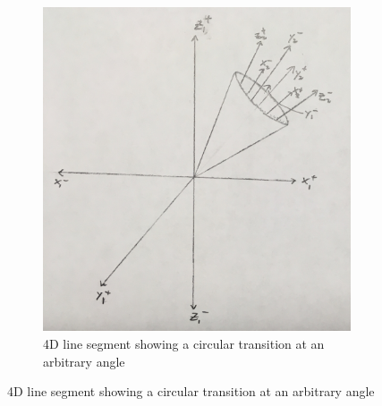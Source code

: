 \documentclass[20pt]{article} %
\begin{document}
\begin{figure}[!htbp]
\begin{subfigure}[!p]{0.448\linewidth}
    	\includegraphics[width=\linewidth]{./figures/fig6.jpg}
	\caption{4D line segment showing a circular transition at an arbitrary angle}
	\label{fig:sub1}
   	\end{subfigure}
\end{figure} 
\end{document}
